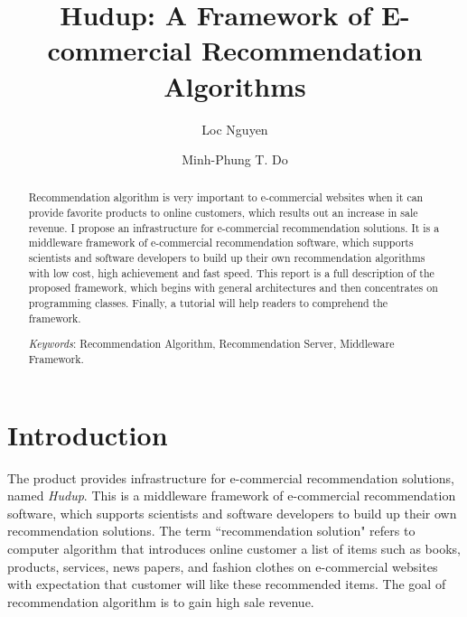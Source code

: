 \documentclass[a4paper]{llncs}
\begin{document}
\pagestyle{empty}

\mainmatter

\title{Hudup: A Framework of E-commercial Recommendation Algorithms}


\author{Loc Nguyen \and Minh-Phung T. Do}



\maketitle

\begin{abstract}
Recommendation algorithm is very important to e-commercial websites when it can provide favorite products to online customers, which results out an increase in sale revenue. I propose an infrastructure for e-commercial recommendation solutions. It is a middleware framework of e-commercial recommendation software, which supports scientists and software developers to build up their own recommendation algorithms with low cost, high achievement and fast speed. This report is a full description of the proposed framework, which begins with general architectures and then concentrates on programming classes. Finally, a tutorial will help readers to comprehend the framework.

\textit{Keywords}: Recommendation Algorithm, Recommendation Server, Middleware Framework.
\end{abstract}

\section{Introduction}
\label{sec:introduction}
The product provides infrastructure for e-commercial recommendation solutions, named \textit{Hudup}. This is a middleware framework of e-commercial recommendation software, which supports scientists and software developers to build up their own recommendation solutions. The term ``recommendation solution" refers to computer algorithm that introduces online customer a list of items such as books, products, services, news papers, and fashion clothes on e-commercial websites with expectation that customer will like these recommended items. The goal of recommendation algorithm is to gain high sale revenue.
\end{document}
